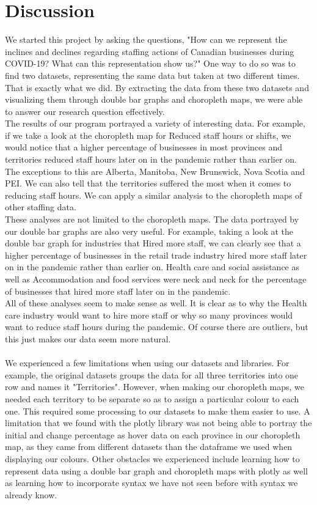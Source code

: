 \documentclass[fontsize=11pt]{article}
\begin{document}
    \section*{Discussion}

    We started this project by asking the questions, "How can we represent the inclines and declines regarding staffing actions of Canadian businesses during COVID-19? What can this representation show us?" One way to do so was to find two datasets, representing the same data but taken at two different times. That is exactly what we did. By extracting the data from these two datasets and visualizing them through double bar graphs and choropleth maps, we were able to answer our research question effectively.
    \\
    The results of our program portrayed a variety of interesting data. For example, if we take a look at the choropleth map for Reduced staff hours or shifts, we would notice that a higher percentage of businesses in most provinces and territories reduced staff hours later on in the pandemic rather than earlier on. The exceptions to this are Alberta, Manitoba, New Brunswick, Nova Scotia and PEI. We can also tell that the territories suffered the most when it comes to reducing staff hours. We can apply a similar analysis to the choropleth maps of other staffing data.
    \\
    These analyses are not limited to the choropleth maps. The data portrayed by our double bar graphs are also very useful. For example, taking a look at the double bar graph for industries that Hired more staff, we can clearly see that a higher percentage of businesses in the retail trade industry hired more staff later on in the pandemic rather than earlier on. Health care and social assistance as well as Accommodation and food services were neck and neck for the percentage of businesses that hired more staff later on in the pandemic.
    \\
    All of these analyses seem to make sense as well. It is clear as to why the Health care industry would want to hire more staff or why so many provinces would want to reduce staff hours during the pandemic. Of course there are outliers, but this just makes our data seem more natural.
    \\
    \\
    We experienced a few limitations when using our datasets and libraries. For example, the original datasets groups the data for all three territories into one row and names it "Territories". However, when making our choropleth maps, we needed each territory to be separate so as to assign a particular colour to each one. This required some processing to our datasets to make them easier to use. A limitation that we found with the plotly library was not being able to portray the initial and change percentage as hover data on each province in our choropleth map, as they came from different datasets than the dataframe we used when displaying our colours. Other obstacles we experienced include learning how to represent data using a double bar graph and choropleth maps with plotly as well as learning how to incorporate syntax we have not seen before with syntax we already know.
\end{document}
